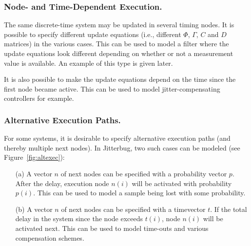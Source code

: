 \documentclass[final,twoside]{rapport}  %
\begin{document}
\subsubsection*{Node- and Time-Dependent Execution.}
The same discrete-time system may be updated in several timing nodes.
It is possible to specify different update equations (i.e., different
$\Phi$, $\Gamma$, $C$ and $D$ matrices) in the various cases. This can
be used to model a filter where the update equations look different
depending on whether or not a measurement value is available. An
example of this type is given later.

It is also possible to make the update equations depend on the time
since the first node became active. This can be used to model
jitter-compensating controllers for example.

\subsubsection*{Alternative Execution Paths.}
For some systems, it is desirable to specify alternative execution
paths (and thereby multiple next nodes). In {\sc Jitterbug}, two
such cases can be modeled (see Figure~\ref{fig:altexec}):
\begin{itemize}
\item[(a)] A vector $n$ of next nodes can be specified with a
  probability vector $p$. After the delay, execution node $n(i)$ will
  be activated with probability $p(i)$. This can be used to model 
  a sample being lost with some probability.
\item[(b)] A vector $n$ of next nodes can be specified with a
  timevector $t$. If the total delay in the system since the 
  node exceeds $t(i)$, node $n(i)$ will be activated next. This can be
  used to model time-outs and various compensation schemes.
\end{itemize}
\end{document}
